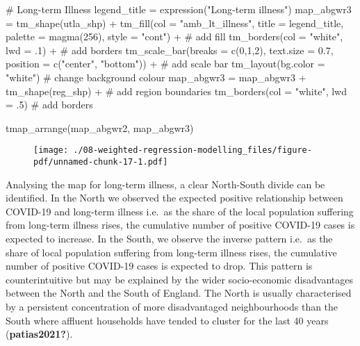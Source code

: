 \documentclass[
  letterpaper,
  krantz2]{style/krantz}
\newenvironment{Shaded}{\begin{snugshade}}{\end{snugshade}}
\newcommand{\AttributeTok}[1]{\textcolor[rgb]{0.40,0.45,0.13}{#1}}
\newcommand{\CommentTok}[1]{\textcolor[rgb]{0.37,0.37,0.37}{#1}}
\newcommand{\DecValTok}[1]{\textcolor[rgb]{0.68,0.00,0.00}{#1}}
\newcommand{\FloatTok}[1]{\textcolor[rgb]{0.68,0.00,0.00}{#1}}
\newcommand{\FunctionTok}[1]{\textcolor[rgb]{0.28,0.35,0.67}{#1}}
\newcommand{\NormalTok}[1]{\textcolor[rgb]{0.00,0.23,0.31}{#1}}
\newcommand{\OtherTok}[1]{\textcolor[rgb]{0.00,0.23,0.31}{#1}}
\newcommand{\SpecialCharTok}[1]{\textcolor[rgb]{0.37,0.37,0.37}{#1}}
\newcommand{\StringTok}[1]{\textcolor[rgb]{0.13,0.47,0.30}{#1}}
\begin{document}
\begin{Shaded}
\begin{Highlighting}[]
  \CommentTok{\# Long{-}term Illness}
\NormalTok{legend\_title }\OtherTok{=} \FunctionTok{expression}\NormalTok{(}\StringTok{"Long{-}term illness"}\NormalTok{)}
\NormalTok{map\_abgwr3 }\OtherTok{=} \FunctionTok{tm\_shape}\NormalTok{(utla\_shp) }\SpecialCharTok{+}
  \FunctionTok{tm\_fill}\NormalTok{(}\AttributeTok{col =} \StringTok{"amb\_lt\_illness"}\NormalTok{, }\AttributeTok{title =}\NormalTok{ legend\_title, }\AttributeTok{palette =} \FunctionTok{magma}\NormalTok{(}\DecValTok{256}\NormalTok{), }\AttributeTok{style =} \StringTok{"cont"}\NormalTok{) }\SpecialCharTok{+} \CommentTok{\# add fill}
  \FunctionTok{tm\_borders}\NormalTok{(}\AttributeTok{col =} \StringTok{"white"}\NormalTok{, }\AttributeTok{lwd =}\NormalTok{ .}\DecValTok{1}\NormalTok{)  }\SpecialCharTok{+} \CommentTok{\# add borders}
  \FunctionTok{tm\_scale\_bar}\NormalTok{(}\AttributeTok{breaks =} \FunctionTok{c}\NormalTok{(}\DecValTok{0}\NormalTok{,}\DecValTok{1}\NormalTok{,}\DecValTok{2}\NormalTok{), }\AttributeTok{text.size =} \FloatTok{0.7}\NormalTok{, }\AttributeTok{position =}  \FunctionTok{c}\NormalTok{(}\StringTok{"center"}\NormalTok{, }\StringTok{"bottom"}\NormalTok{)) }\SpecialCharTok{+} \CommentTok{\# add scale bar}
  \FunctionTok{tm\_layout}\NormalTok{(}\AttributeTok{bg.color =} \StringTok{"white"}\NormalTok{) }\CommentTok{\# change background colour}
\NormalTok{map\_abgwr3 }\OtherTok{=}\NormalTok{ map\_abgwr3 }\SpecialCharTok{+} \FunctionTok{tm\_shape}\NormalTok{(reg\_shp) }\SpecialCharTok{+} \CommentTok{\# add region boundaries}
  \FunctionTok{tm\_borders}\NormalTok{(}\AttributeTok{col =} \StringTok{"white"}\NormalTok{, }\AttributeTok{lwd =}\NormalTok{ .}\DecValTok{5}\NormalTok{) }\CommentTok{\# add borders}

\FunctionTok{tmap\_arrange}\NormalTok{(map\_abgwr2, map\_abgwr3)}
\end{Highlighting}
\end{Shaded}

\begin{figure}[H]

{\centering \texttt{[image: ./08-weighted-regression-modelling\_files/figure-pdf/unnamed-chunk-17-1.pdf]}

}

\end{figure}

Analysing the map for long-term illness, a clear North-South divide can
be identified. In the North we observed the expected positive
relationship between COVID-19 and long-term illness i.e.~as the share of
the local population suffering from long-term illness rises, the
cumulative number of positive COVID-19 cases is expected to increase. In
the South, we observe the inverse pattern i.e.~as the share of local
population suffering from long-term illness rises, the cumulative number
of positive COVID-19 cases is expected to drop. This pattern is
counterintuitive but may be explained by the wider socio-economic
disadvantages between the North and the South of England. The North is
usually characterised by a persistent concentration of more
disadvantaged neighbourhoods than the South where affluent households
have tended to cluster for the last 40 years (\textbf{patias2021?}).
\end{document}
